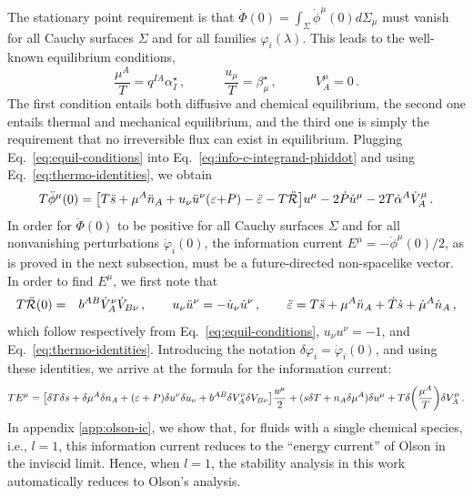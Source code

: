 \documentclass[
a4paper,
amsfonts,
amsmath,
reprint,
showkeys,
nofootinbib,
twoside,
onecolumn,
notitlepage
]{revtex4-1}
\newcommand{\spc}{\quad \quad \quad}
\begin{document}
	The stationary point requirement is that $\dot{\Phi}(0)=\int_\Sigma \dot{\phi}^\mu(0)d\Sigma_\mu$ must vanish for all Cauchy surfaces $\Sigma$ and for all families $\varphi_i(\lambda)$.
	This leads to the well-known equilibrium conditions,
	\begin{equation}\label{eq:equil-conditions}
		\dfrac{\mu^A}{T}=q^{IA}\alpha^\star_I \, ,  \spc \dfrac{u_\mu}{T}= \beta^\star_\mu \, , \spc V_A^\mu =0 \, .
	\end{equation}
	The first condition entails both diffusive and chemical equilibrium, the second one entails thermal and mechanical equilibrium, and the third one is simply the requirement that no irreversible flux can exist in equilibrium. 
	Plugging Eq.\ \eqref{eq:equil-conditions} into Eq.\ \eqref{eq:info-c-integrand-phiddot} and using Eq.\ \eqref{eq:thermo-identities}, we obtain
	\begin{equation}
		T\ddot{\phi}^\mu(0) =  \big[T\ddot{s}+\mu^A \ddot{n}_A+u_\nu \ddot{u}^\nu (\varepsilon{+}P) - \ddot{\varepsilon}-T\ddot{{\mathcal{R}}}\big]u^\mu-2 \dot{P}\dot{u}^\mu  -2T\dot{\alpha}^A \dot{V}_A^\mu \, .
	\end{equation}
	In order for $\ddot{\Phi}(0)$ to be positive for all Cauchy surfaces $\Sigma$ and for all nonvanishing perturbations $\dot{\varphi}_i(0)$, the information current $E^\mu=-\ddot{\phi}^\mu(0)/2$, as is proved in the next subsection, must be a future-directed non-spacelike vector.
	In order to find $E^\mu$, we first note that
	\begin{eqnarray}
		T\ddot{{\mathcal{R}}}(0)&=& b^{AB}\dot{V}_A^\nu \dot{V}_{B \nu} \, ,\qquad 
		u_\nu \ddot{u}^\nu = -\dot{u}_\nu \dot{u}^\nu \, , \qquad
		\ddot{\varepsilon}= T \ddot{s}+\mu^A\ddot{n}_A +\dot{T} \dot{s} +\dot{\mu}^A \dot{ n}_A \, ,
	\end{eqnarray}
	which follow respectively from Eq.\ \eqref{eq:equil-conditions}, $u_\nu u^\nu=-1$, and Eq.\ \eqref{eq:thermo-identities}.
	Introducing the notation $\delta \varphi_i = \dot{\varphi}_i(0)$, and using these identities, we arrive at the formula for the information current:
	\begin{equation}\label{eq:is-info-current}
		TE^\mu = \big[ \delta T \delta s +\delta \mu^A \delta n_A +(\varepsilon+P)\delta u^\nu \delta u_\nu + b^{AB} \delta V_A^\nu \delta V_{B\nu} \big]\dfrac{u^\mu}{2} + (s \delta T+n_A \delta \mu^A)\delta u^\mu +T\delta \bigg(\dfrac{\mu^A}{T} \bigg)\delta V_A^\mu \, .
	\end{equation}
	In appendix \ref{app:olson-ic}, we show that, for fluids with a single chemical species, i.e., $l=1$, this information current reduces to the ``energy current'' of Olson \cite{OlsonLifsh1990} in the inviscid limit. Hence, when $l=1$, the stability analysis in this work automatically reduces to Olson's analysis.
	
\end{document}

